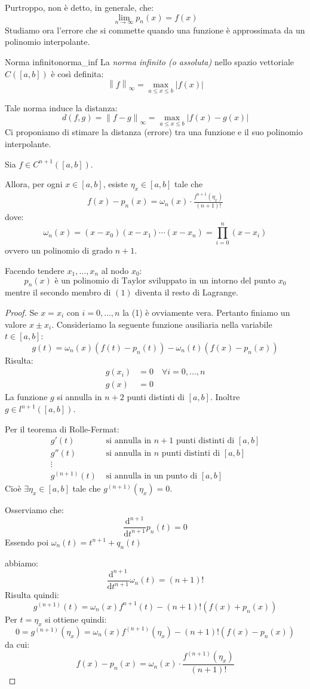 \documentclass[12pt]{report}
\newcounter{definition}
\newcounter{proposition}
\newcommand{\nmu}{}
\begin{document}
Purtroppo, non è detto, in generale, che:
\[
\lim\limits_{n\to\infty}p_n(x) = f(x)
\]
Studiamo ora l'errore che si commette quando una funzione è approssimata da un polinomio interpolante.
\begin{definition}{\nmu Norma infinito}{norma_inf}
	La \textit{norma infinito (o assoluta)} nello spazio vettoriale $C([a, b])$ è così definita:
	\[
	\left\|f\right\|_{\infty} = \max_{a \leq x \leq b}\left| f(x)\right|
	\]
\end{definition}
Tale norma induce la distanza:
	\[
	d(f, g) = \left\|f-g\right\|_{\infty} = \max_{a \leq x \leq b}\left| f(x) - g(x)\right|
	\]
	Ci proponiamo di stimare la distanza (errore) tra una funzione e il suo polinomio interpolante.
\begin{proposition}{}{}
Sia $f \in C^{n+1}([a, b])$.

Allora, per ogni $x \in [a, b]$, esiste $\eta_x \in [a, b]$ tale che
\begin{align}
f(x) - p_n(x) = \omega_n(x) \cdot \frac{f^{n+1}(\eta_x)}{(n+1)!}
\end{align}
dove:
\[
\omega_n(x) = (x - x_0)(x-x_1)\cdots (x-x_n) = \prod_{i=0}^{n}(x-x_i)
\]
ovvero un polinomio di grado $n + 1$.
\end{proposition}
\begin{note}{}{}
Facendo tendere $x_1, \dots, x_n$ al nodo $x_0$:
\[
p_n(x) \text{ è un polinomio di Taylor sviluppato in un intorno del punto $x_0$}
\]
mentre il secondo membro di $(1)$ diventa il resto di Lagrange.
\end{note}
\begin{proof}
Se $x = x_i$ con $i = 0, \dots, n$ la (1) è ovviamente vera. Pertanto finiamo un valore $x \pm x_i$. Consideriamo la seguente funzione ausiliaria nella variabile $t \in [a, b]$:
\[
g(t) = \omega_n(x)(f(t) - p_n(t)) - \omega_n(t)(f(x) - p_n(x))
\]
Risulta:
\begin{align*}
g(x_i) &= 0 \quad \forall i = 0, \dots, n \\
g(x) &= 0
\end{align*}
La funzione $g$ si annulla in $n+2$ punti distinti di $[a, b]$. Inoltre $g \in l^{n+1}([a, b])$.

Per il teorema di Rolle-Fermat:
\begin{align*}
	g'(t) & \text{ si annulla in $n+1$ punti distinti di $[a, b]$} \\
	g''(t) & \text{ si annulla in $n$ punti distinti di $[a, b]$} \\
	\vdots \\
	g^{(n+1)}(t) & \text{ si annulla in un punto di $[a, b]$}
\end{align*}
Cioè $\exists \eta_x \in [a, b]$ tale che $g^{(n+1)}(\eta_x) = 0$.

Osserviamo che:
\[
\frac{\text{d}^{n+1}}{\text{d}t^{n+1}}p_n(t) = 0
\]
Essendo poi $\omega_n(t) = t^{n+1} + q_n(t)$

abbiamo:
\[
\frac{\text{d}^{n+1}}{\text{d}t^{n+1}}\omega_n(t) = (n+1)!
\]
Risulta quindi:
\[
g^{(n+1)}(t) = \omega_n(x)f^{n+1}(t) - (n+1)!(f(x) + p_n(x))
\]
Per $t = \eta_x$ si ottiene quindi:
\[
0 = g^{(n+1)}(\eta_x) = \omega_n(x)f^{(n+1)}(\eta_x) - (n+1)!(f(x) - p_n(x))
\]
da cui:
\[
f(x) - p_n(x) = \omega_n(x) \cdot \frac{f^{(n+1)}(\eta_x)}{(n+1)!}
\]
\end{proof}
\end{document}

